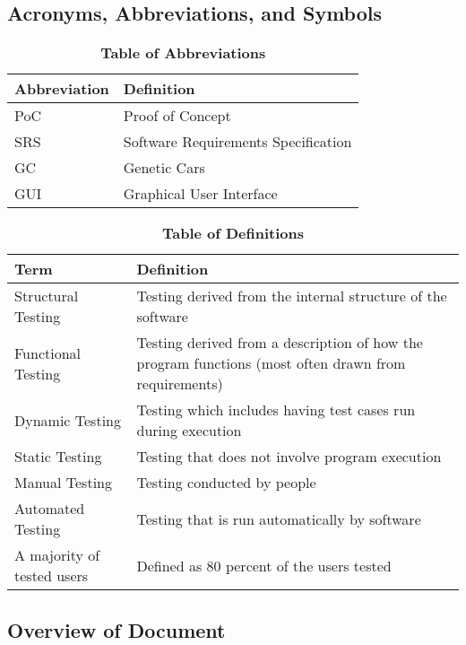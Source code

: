 \documentclass[12pt, titlepage]{article}
\begin{document}
\subsection{Acronyms, Abbreviations, and Symbols}
	
\begin{table}[hbp]
\caption{\textbf{Table of Abbreviations}} \label{Table}

\begin{tabularx}{\textwidth}{p{3cm}X}
\toprule
\textbf{Abbreviation} & \textbf{Definition} \\
\midrule
PoC & Proof of Concept\\
SRS & Software Requirements Specification\\
GC & Genetic Cars\\
GUI & Graphical User Interface\\
\bottomrule
\end{tabularx}

\end{table}

\begin{table}[!htbp]
\caption{\textbf{Table of Definitions}} \label{Table}

\begin{tabularx}{\textwidth}{p{3cm}X}
\toprule
\textbf{Term} & \textbf{Definition}\\
\midrule
Structural Testing & Testing derived from the internal structure of the software\\
Functional Testing & Testing derived from a description of how the program functions (most often drawn from requirements)\\
Dynamic Testing & Testing which includes having test cases run during execution\\
Static Testing & Testing that does not involve program execution\\
Manual Testing & Testing conducted by people\\
Automated Testing & Testing that is run automatically by software\\
A majority of tested users & Defined as 80 percent of the users tested\\
\bottomrule
\end{tabularx}

\end{table}	

\subsection{Overview of Document}
\end{document}
